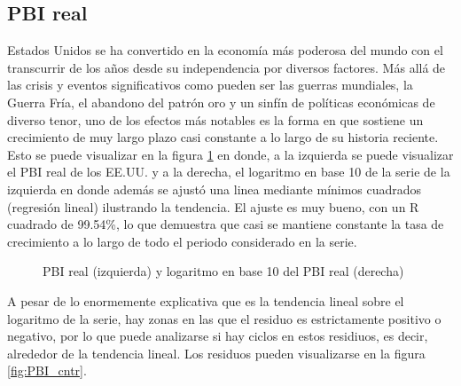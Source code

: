 \documentclass[a4paper]{article}
\begin{document}
\subsection{PBI real}
Estados Unidos se ha convertido en la economía más poderosa del mundo con el transcurrir de los años desde su independencia por diversos factores. Más allá de las crisis y eventos significativos como pueden ser las guerras mundiales, la Guerra Fría, el abandono del patrón oro y un sinfín de políticas económicas de diverso tenor, uno de los efectos más notables es la forma en que sostiene un crecimiento de muy largo plazo casi constante a lo largo de su historia reciente. Esto se puede visualizar en la figura \ref{fig:PBI_orig} en donde, a la izquierda se puede visualizar el PBI real de los EE.UU. y a la derecha, el logaritmo en base 10 de la serie de la izquierda en donde además se ajustó una linea mediante mínimos cuadrados (regresión lineal) ilustrando la tendencia. El ajuste es muy bueno, con un R cuadrado de 99.54\%, lo que demuestra que casi se mantiene constante la tasa de crecimiento a lo largo de todo el periodo considerado en la serie.

\begin{figure}[H]
	\centering
	\caption{PBI real (izquierda) y logaritmo en base 10 del PBI real (derecha)} 	
	\label{fig:PBI_orig}
\end{figure}

A pesar de lo enormemente explicativa que es la tendencia lineal sobre el logaritmo de la serie, hay zonas en las que el residuo es estrictamente positivo o negativo, por lo que puede analizarse si hay ciclos en estos residiuos, es decir, alrededor de la tendencia lineal. Los residuos pueden visualizarse en la figura \ref{fig:PBI_cntr}.
\end{document}
